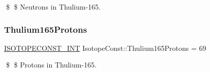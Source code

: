\$ \$ Neutrons in Thulium-\/165. \mbox{\label{group___isotope_const-_thulium-_tm165_ga62d92e4e7fdba025ee1ea17b0305be74}} 
\subsubsection{\texorpdfstring{Thulium165\+Protons}{Thulium165Protons}}
{\footnotesize\ttfamily \mbox{\hyperlink{group___isotope_const-_macros_ga5f18360b3e99483a35c32d789e62621c}{I\+S\+O\+T\+O\+P\+E\+C\+O\+N\+S\+T\+\_\+\+I\+NT}} Isotope\+Const\+::\+Thulium165\+Protons = 69}

\$ \$ Protons in Thulium-\/165. 